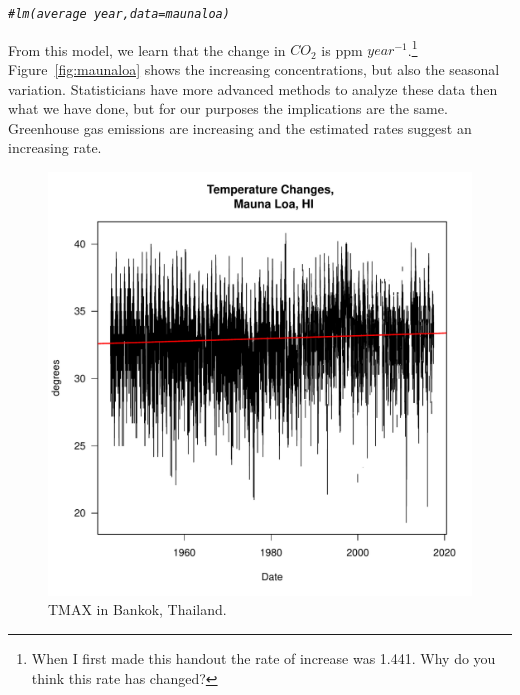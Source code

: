 \documentclass{article}\usepackage[]{graphicx}\usepackage[]{color}
\makeatletter
\def\maxwidth{ %
  \ifdim\Gin@nat@width>\linewidth
    \linewidth
  \else
    \Gin@nat@width
  \fi
}
\newcommand{\hlcom}[1]{\textcolor[rgb]{0.678,0.584,0.686}{\textit{#1}}}%
\newenvironment{kframe}{%
 \def\at@end@of@kframe{}%
 \ifinner\ifhmode%
  \def\at@end@of@kframe{\end{minipage}}%
  \begin{minipage}{\columnwidth}%
 \fi\fi%
 \def\FrameCommand##1{\hskip\@totalleftmargin \hskip-\fboxsep
 \colorbox{shadecolor}{##1}\hskip-\fboxsep
     \hskip-\linewidth \hskip-\@totalleftmargin \hskip\columnwidth}%
 \MakeFramed {\advance\hsize-\width
   \@totalleftmargin\z@ \linewidth\hsize
   \@setminipage}}%
 {\par\unskip\endMakeFramed%
 \at@end@of@kframe}
\newenvironment{knitrout}{}{} %
\makeatother
\begin{document}
\begin{knitrout}
\color{fgcolor}\begin{kframe}
\begin{alltt}
\hlcom{#lm(average ~ year, data=maunaloa)}
\end{alltt}
\end{kframe}
\end{knitrout}

From this model, we learn that the change in $CO_2$ is 
ppm $year^{-1}$.\footnote{When I first made this handout the rate of increase was 1.441. Why do you think this rate has changed?} Figure~\ref{fig:maunaloa} shows the increasing concentrations, but also the seasonal variation. Statisticians have more advanced methods to analyze these data then what we have done, but for our purposes the implications are the same.  Greenhouse gas emissions are increasing and the estimated rates suggest an increasing rate.

\begin{figure}
\label{fig:xxtest}
\caption{TMAX in Bankok, Thailand.}
\begin{knitrout}
\color{fgcolor}
\includegraphics[width=\maxwidth]{figure/unnamed-chunk-15-1} 

\end{knitrout}
\end{figure}
\end{document}
